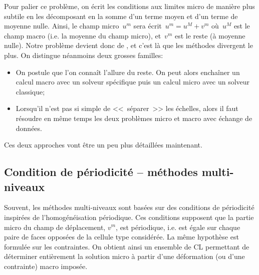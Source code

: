 
Pour palier ce problème, on écrit les conditions aux limites micro de manière plus subtile en les décomposant
en la somme d'un terme moyen et d'un terme de moyenne nulle. Ainsi, le champ micro~$u^m$
sera écrit~$u^m=u^M +v^m$ où~$u^M$ est le champ macro (i.e. la moyenne du champ micro),
et~$v^m$ est le reste (à moyenne nulle).
Notre problème devient donc de , et c'est là
que les méthodes divergent le plus. On distingue néanmoins deux grosses familles:
\begin{itemize}
  \item {}

	On postule que l'on connaît l'allure du reste. On peut alors enchaîner un calcul macro
	avec un solveur spécifique puis un calcul micro avec un solveur classique;
  \item {}

	Lorsqu'il n'est pas si simple de <<~séparer~>> les échelles, alors il faut résoudre
	en même temps les deux problèmes micro et macro avec échange de données.
\end{itemize}
Ces deux approches vont être un peu plus détaillées maintenant.




\medskip
\subsection{Condition de périodicité -- méthodes multi-niveaux}

Souvent, les méthodes multi-niveaux sont basées sur des conditions de périodicité
inspirées de l'homogénéisation périodique.
Ces conditions supposent que la partie micro du champ de déplacement, $v^m$, est périodique,
i.e. est égale sur chaque paire de faces opposées de la cellule type considérée.
La même hypothèse est formulée sur les contraintes.
On obtient ainsi un ensemble de CL permettant de déterminer entièrement la solution micro à
partir d'une déformation (ou d'une contrainte) macro imposée.

